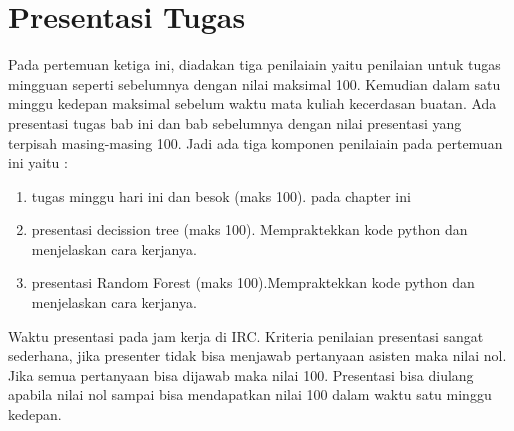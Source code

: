 \section{Presentasi Tugas}
Pada pertemuan ketiga ini, diadakan tiga penilaiain yaitu penilaian untuk tugas mingguan seperti sebelumnya dengan nilai maksimal 100. Kemudian dalam satu minggu kedepan maksimal sebelum waktu mata kuliah kecerdasan buatan. Ada presentasi tugas bab ini dan bab sebelumnya dengan nilai presentasi yang terpisah masing-masing 100. Jadi ada tiga komponen penilaiain pada pertemuan ini yaitu :
\begin{enumerate}
	\item tugas minggu hari ini dan besok (maks 100). pada chapter ini
	\item presentasi decission tree (maks 100). Mempraktekkan kode python dan menjelaskan cara kerjanya.
	\item presentasi Random Forest (maks 100).Mempraktekkan kode python dan menjelaskan cara kerjanya.
\end{enumerate}
Waktu presentasi pada jam kerja di IRC. Kriteria penilaian presentasi sangat sederhana, jika presenter tidak bisa menjawab pertanyaan asisten maka nilai nol. Jika semua pertanyaan bisa dijawab maka nilai 100. Presentasi bisa diulang apabila nilai nol sampai bisa mendapatkan nilai 100 dalam waktu satu minggu kedepan.


